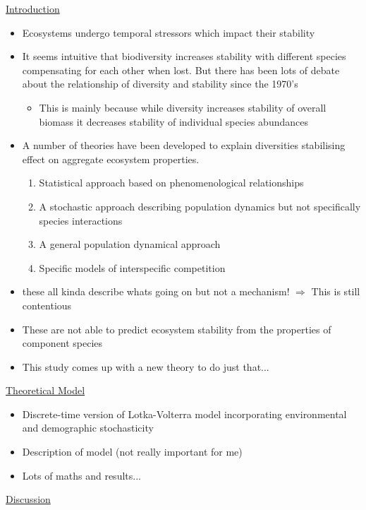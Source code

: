 \underline{Introduction}
\begin{itemize}
	\item Ecosystems undergo temporal stressors which impact their stability
	\item It seems intuitive that biodiversity increases stability with different species compensating for each other when lost. But there has been lots of debate about the relationship of diversity and stability since the 1970's
	\begin{itemize}
		\item This is mainly because while diversity increases stability of overall biomass it decreases stability of individual species abundances
	\end{itemize}
	\item A number of theories have been developed to explain diversities stabilising effect on aggregate ecosystem properties.
	\begin{enumerate}
		\item Statistical approach based on phenomenological relationships
		\item A stochastic approach describing population dynamics but not specifically species interactions
		\item A general population dynamical approach
		\item Specific models of interspecific competition 
	\end{enumerate}
	\item these all kinda describe whats going on but not a mechanism! $\Rightarrow$ This is still contentious
	\item These are not able to predict ecosystem stability from the properties of component species
	\item This study comes up with a new theory to do just that...
	\end{itemize}
\underline{Theoretical Model}
\begin{itemize}
	\item Discrete-time version of Lotka-Volterra model incorporating environmental and demographic stochasticity
	\item Description of model (not really important for me)
	\item Lots of maths and results...  
\end{itemize}
\underline{Discussion}
